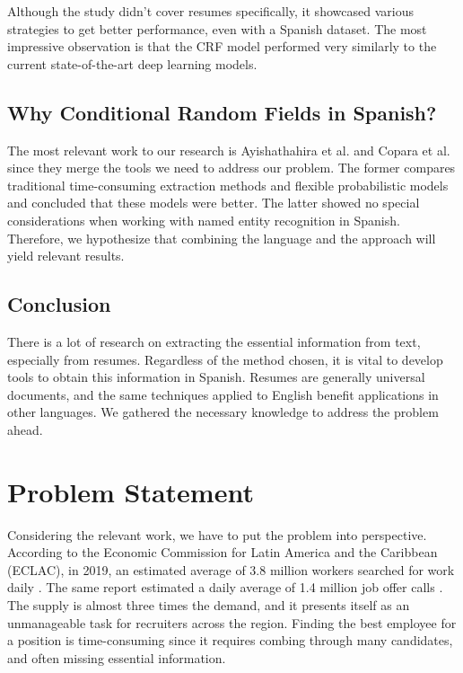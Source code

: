   Although the study didn't cover resumes specifically, it showcased various
  strategies to get better performance, even with a Spanish dataset. The most
  impressive observation is that the CRF model performed very similarly to the
  current state-of-the-art deep learning models.

\section{Why Conditional Random Fields in Spanish?}
The most relevant work to our research is Ayishathahira et al.
\cite{Ayishathahira2018a} and Copara et al. \cite{Copara2016} since they merge
the tools we need to address our problem. The former compares traditional
time-consuming extraction methods and flexible probabilistic models and
concluded that these models were better. The latter showed no special
considerations when working with named entity recognition in Spanish.
Therefore, we hypothesize that combining the language and the approach will
yield relevant results.

\section{Conclusion}
There is a lot of research on extracting the essential information from text,
especially from resumes. Regardless of the method chosen, it is vital to
develop tools to obtain this information in Spanish. Resumes are generally
universal documents, and the same techniques applied to English benefit
applications in other languages. We gathered the necessary knowledge to address
the problem ahead.



\chapter{Problem Statement} %

\label{Cap3} %

  Considering the relevant work, we have to put the problem into perspective.
  According to the Economic Commission for Latin America and the Caribbean
  (ECLAC), in 2019, an estimated average of 3.8 million workers searched for
  work daily \cite{Hilbert2020a}. The same report estimated a daily average of
  1.4 million job offer calls \cite{Hilbert2020a}. The supply is almost three
  times the demand, and it presents itself as an unmanageable task for
  recruiters across the region. Finding the best employee for a position is
  time-consuming since it requires combing through many candidates, and often
  missing essential information.

